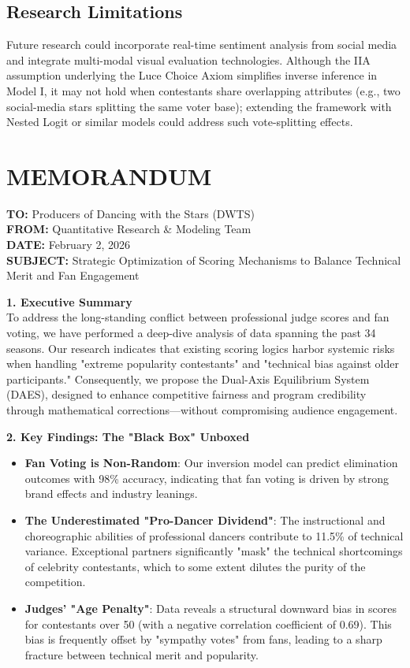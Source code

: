 \documentclass[12pt]{article}
\begin{document}
	\subsection{Research Limitations}
	Future research could incorporate real-time sentiment analysis from social media and integrate multi-modal visual evaluation technologies. Although the IIA assumption underlying the Luce Choice Axiom simplifies inverse inference in Model I, it may not hold when contestants share overlapping attributes (e.g., two social-media stars splitting the same voter base); extending the framework with Nested Logit or similar models could address such vote-splitting effects.
	
	\clearpage
	
	\section*{MEMORANDUM}
	\noindent \textbf{TO:} Producers of Dancing with the Stars (DWTS) \\
	\textbf{FROM:} Quantitative Research \& Modeling Team \\
	\textbf{DATE:} February 2, 2026 \\
	\textbf{SUBJECT:} Strategic Optimization of Scoring Mechanisms to Balance Technical Merit and Fan Engagement
	
	\vspace{1em}
	\noindent \textbf{1. Executive Summary} \\
	To address the long-standing conflict between professional judge scores and fan voting, we have performed a deep-dive analysis of data spanning the past 34 seasons. Our research indicates that existing scoring logics harbor systemic risks when handling "extreme popularity contestants" and "technical bias against older participants." Consequently, we propose the Dual-Axis Equilibrium System (DAES), designed to enhance competitive fairness and program credibility through mathematical corrections—without compromising audience engagement.
	
	\noindent \textbf{2. Key Findings: The "Black Box" Unboxed} \\
	\begin{itemize}
		\item \textbf{Fan Voting is Non-Random}: Our inversion model can predict elimination outcomes with 98\% accuracy, indicating that fan voting is driven by strong brand effects and industry leanings.
		\item \textbf{The Underestimated "Pro-Dancer Dividend"}: The instructional and choreographic abilities of professional dancers contribute to 11.5\% of technical variance. Exceptional partners significantly "mask" the technical shortcomings of celebrity contestants, which to some extent dilutes the purity of the competition.
		\item \textbf{Judges' "Age Penalty"}: Data reveals a structural downward bias in scores for contestants over 50 (with a negative correlation coefficient of 0.69). This bias is frequently offset by "sympathy votes" from fans, leading to a sharp fracture between technical merit and popularity.
	\end{itemize}
	
\end{document}
